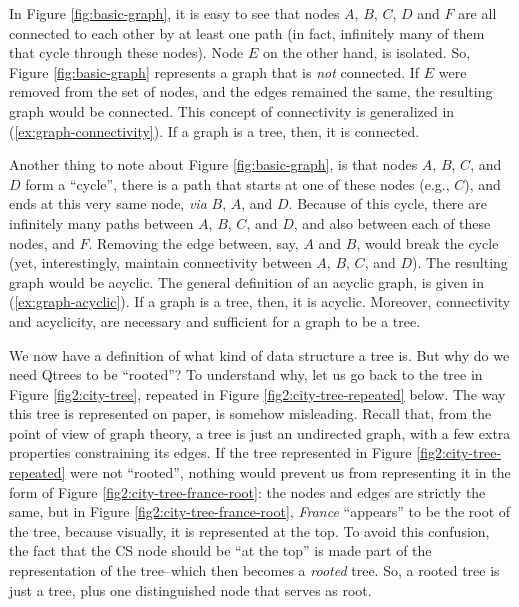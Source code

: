 In Figure \ref{fig:basic-graph}, it is easy to see that nodes $A$, $B$, $C$, $D$ and $F$ are all connected to each other by at least one path (in fact, infinitely many of them that cycle through these nodes). Node $E$ on the other hand, is isolated. So, Figure \ref{fig:basic-graph} represents a graph that is \textit{not} connected. If $E$ were removed from the set of nodes, and the edges remained the same, the resulting graph would be connected. This concept of connectivity is generalized in (\ref{ex:graph-connectivity}). If a graph is a tree, then, it is connected.
\begin{exe}
	\label{ex:graph-connectivity}
\end{exe}

Another thing to note about Figure \ref{fig:basic-graph}, is that nodes $A$, $B$, $C$, and $D$ form a ``cycle'', there is a path that starts at one of these nodes (e.g., $C$), and ends at this very same node, \textit{via} $B$, $A$, and $D$. Because of this cycle, there are infinitely many paths between $A$, $B$, $C$, and $D$, and also between each of these nodes, and $F$. Removing the edge between, say, $A$ and $B$, would break the cycle (yet, interestingly, maintain connectivity between $A$, $B$, $C$, and $D$). The resulting graph would be acyclic. The general definition of an acyclic graph, is given in (\ref{ex:graph-acyclic}). If a graph is a tree, then, it is acyclic. Moreover, connectivity and acyclicity, are necessary and sufficient for a graph to be a tree.

\begin{exe}
	\label{ex:graph-acyclic}
\end{exe}

We now have a definition of what kind of data structure a tree is. But why do we need  Qtrees to be ``rooted''? To understand why, let us go back to the tree in Figure \ref{fig2:city-tree}, repeated in Figure \ref{fig2:city-tree-repeated} below. The way this tree is represented on paper, is somehow misleading. Recall that, from the point of view of graph theory, a tree is just an undirected graph, with a few extra properties constraining its edges. If the tree represented in Figure \ref{fig2:city-tree-repeated} were not ``rooted'', nothing would prevent us from representing it in the form of Figure \ref{fig2:city-tree-france-root}: the nodes and edges are strictly the same, but in Figure \ref{fig2:city-tree-france-root}, \textit{France} ``appears'' to be the root of the tree, because visually, it is represented at the top. To avoid this confusion, the fact that the CS node should be ``at the top'' is made part of the representation of the tree--which then becomes a \textit{rooted} tree. So, a rooted tree is just a tree, plus one distinguished node that serves as root.

